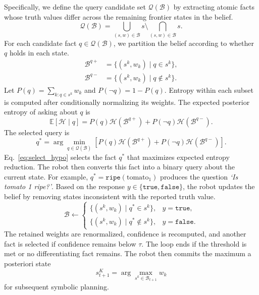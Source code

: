 Specifically, we define the query candidate set $\mathcal{Q}(\mathcal{B})$ by extracting atomic facts whose truth values differ across the remaining frontier states in the belief.
\[
\mathcal{Q}(\mathcal{B})
=
\bigcup_{(s,w)\in\mathcal{B}}s
\setminus
\bigcap_{(s,w)\in\mathcal{B}}s.
\]
For each candidate fact $q\in\mathcal{Q}(\mathcal{B})$, we partition the belief according to whether $q$ holds in each state.
\[
\begin{aligned}
\mathcal{B}^{q+}&=\{(s^k,w_k)\mid q\in s^k\},\\
\mathcal{B}^{q-}&=\{(s^k,w_k)\mid q\notin s^k\}.
\end{aligned}
\]
Let $P(q)=\sum_{k:q\in s^k}w_k$ and $P(\neg q)=1-P(q)$. Entropy within each subset is computed after conditionally normalizing its weights. The expected posterior entropy of asking about $q$ is
\[
\mathbb{E}[\mathcal{H}\mid q]
=
P(q)\mathcal{H}(\mathcal{B}^{q+})
+
P(\neg q)\mathcal{H}(\mathcal{B}^{q-}).
\]
The selected query is
\begin{equation}
q^*
=
\arg\min_{q\in\mathcal{Q}(\mathcal{B})}
\left[
P(q)\mathcal{H}(\mathcal{B}^{q+})
+
P(\neg q)\mathcal{H}(\mathcal{B}^{q-})
\right].
\label{eq:select_hypo}
\end{equation}
Eq.~\ref{eq:select_hypo} selects the fact $q^*$ that maximizes expected entropy reduction. The robot then converts this fact into a binary query about the current state. For example, $q^*=\texttt{ripe}(\text{tomato}_1)$ produces the question \textit{`Is tomato 1 ripe?'}. Based on the response $y\in\{\texttt{true},\texttt{false}\}$, the robot updates the belief by removing states inconsistent with the reported truth value.
\begin{equation}
\mathcal{B}
\leftarrow
\begin{cases}
\{(s^k,w_k)\mid q^*\in s^k\}, & y=\texttt{true},\\
\{(s^k,w_k)\mid q^*\notin s^k\}, & y=\texttt{false}.
\end{cases}
\label{eq:filter}
\end{equation}
The retained weights are renormalized, confidence is recomputed, and another fact is selected if confidence remains below $\tau$. The loop ends if the threshold is met or no differentiating fact remains. The robot then commits the maximum a posteriori state
\[
s_{t+1}^{K}
=
\arg\max_{s^k\in\mathcal{B}_{t+1}}w_k
\]
for subsequent symbolic planning.

